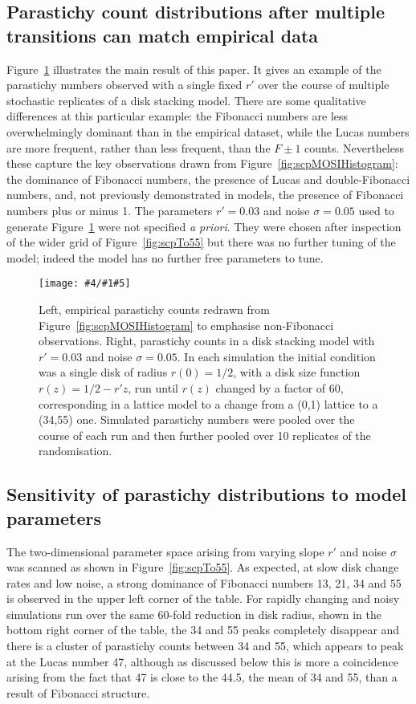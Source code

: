 \documentclass[a4paper,10pt]{amsart}
\newlength{\jfigwidth}
\newcommand{\pdffig}[3]{\jdofig{#1}{#2}{#3}{Figures}{.pdf}}
\newcommand{\jdofig}[5]{
	\begin{figure}\centering\texttt{[image: \#4/\#1\#5]} \caption{#2}\label{fig:#1}\end{figure}
}
\begin{document}
\subsection{Parastichy count distributions after multiple transitions can match empirical data}
Figure~\ref{fig:scpAhaPair} illustrates the main result of this paper. It gives an example of the parastichy numbers observed with a single fixed $r'$ over the course of multiple stochastic replicates of a disk stacking model.    There are some qualitative differences at this particular example: the Fibonacci numbers are less overwhelmingly dominant than in the empirical dataset, while the Lucas numbers are more frequent, rather than less frequent, than the $F\pm1$ counts. Nevertheless these capture the key observations drawn from  Figure~\ref{fig:scpMOSIHistogram}: the dominance of Fibonacci numbers, the  presence of Lucas and double-Fibonacci numbers, and,  not previously demonstrated in models, the presence of Fibonacci numbers plus or minus 1. 
The parameters $r'=0.03$ and noise $\sigma=0.05$ used to generate Figure~\ref{fig:scpAhaPair} were not specified \textit{a priori}. They were chosen after inspection of the wider grid of Figure~\ref{fig:scpTo55} but there was no further tuning of the model;  indeed the model has no further free parameters to tune.

\pdffig{scpAhaPair}{Left, empirical parastichy counts redrawn from Figure~\ref{fig:scpMOSIHistogram} to emphasise non-Fibonacci observations. Right,  parastichy counts in a disk stacking model with $r'=0.03$ and noise $\sigma=0.05$. In each simulation the initial condition was a single disk of radius $r(0)=1/2$, with a disk size function $r(z)=1/2- r'z$, run until $r(z)$ changed by a factor of  60, corresponding in a lattice model to a change from a (0,1) lattice to a (34,55) one. 
	Simulated parastichy numbers were pooled over the course of each run and then further pooled over 10 replicates of the randomisation. }{1}

\subsection{Sensitivity of parastichy distributions to model parameters}

The two-dimensional parameter space arising from varying slope $r'$ and noise $\sigma$ was scanned as shown in  Figure~\ref{fig:scpTo55}. As expected, at slow disk change rates and low noise, a strong dominance of Fibonacci numbers 13, 21, 34 and 55 is observed in the upper left corner of the table. For rapidly changing and noisy simulations run over the same 60-fold reduction in disk radius, shown in the bottom right corner of the table, the 34 and 55 peaks completely disappear and there is a cluster of parastichy counts between 34 and 55, which appears to peak at the Lucas number 47, although as discussed below this is more a coincidence arising from the fact that 47 is close to the 44.5, the mean of 34 and 55, than a result of Fibonacci structure. 
\end{document}
